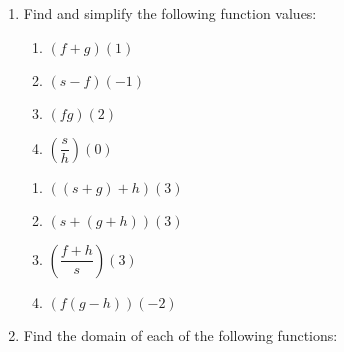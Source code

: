 \documentclass{ximera}
\begin{document}
\begin{example}
\begin{enumerate}
\item  \label{funcarithfindvaluesex} Find and simplify the following function values:

\begin{multicols}{4}

\begin{enumerate}

\item  $(f+g)(1)$ 

\item $(s-f)(-1)$ 

\item $(fg)(2)$ 

\item  $\left( \dfrac{s}{h} \right)(0)$

\setcounter{HW}{\value{enumii}}

\end{enumerate}

\end{multicols}


\begin{multicols}{4}

\begin{enumerate}

\setcounter{enumii}{\value{HW}}

\item \label{threefunctionsfirstex} $((s+g)+h)(3)$  

\item $(s+(g+h))(3)$  

\item $\left(\dfrac{f+h}{s}\right)(3)$

\item  \label{threefunctionslastex} $(f(g-h))(-2)$ 

\end{enumerate}

\end{multicols}

\item  Find the domain of each of the following functions:

\begin{multicols}{2}

\begin{enumerate}


\end{enumerate}
\end{multicols}
\end{enumerate}
\end{example}
\end{document}
